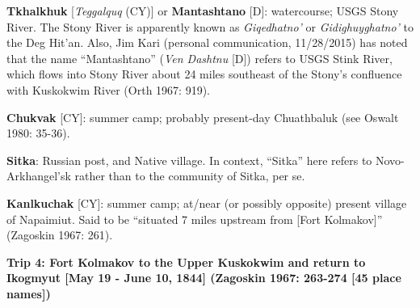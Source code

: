 \begin{hang}
\textbf{Tkhalkhuk} [\textit{Teggalquq} (CY)] or \textbf{Mantashtano} [D]: watercourse; USGS Stony River. The Stony River is apparently known as \textit{Giqedhatno’} or \textit{Gidighuyghatno’} to the Deg Hit’an. Also, Jim Kari (personal communication, 11/28/2015) has noted that the name “Mantashtano” (\textit{Ven Dashtnu} [D]) refers to USGS Stink River, which flows into Stony River about 24 miles southeast of the Stony’s confluence with Kuskokwim River (Orth 1967: 919).



\textbf{Chukvak} [CY]: summer camp; probably present-day Chuathbaluk (see Oswalt 1980: 35-36).



\textbf{Sitka}: Russian post, and Native village. In context, “Sitka” here refers to Novo-Arkhangel’sk rather than to the community of Sitka, per se.



\textbf{Kanlkuchak} [CY]: summer camp; at/near (or possibly opposite) present village of Napaimiut. Said to be “situated 7 miles upstream from [Fort Kolmakov]” (Zagoskin 1967: 261).

\end{hang}

\vspace{1cm}
\noindent
\textbf{Trip 4: Fort Kolmakov to the Upper Kuskokwim and return to Ikogmyut [May 19 - June 10, 1844] (Zagoskin 1967: 263-274 [45 place names])}
\vspace{6pt}


